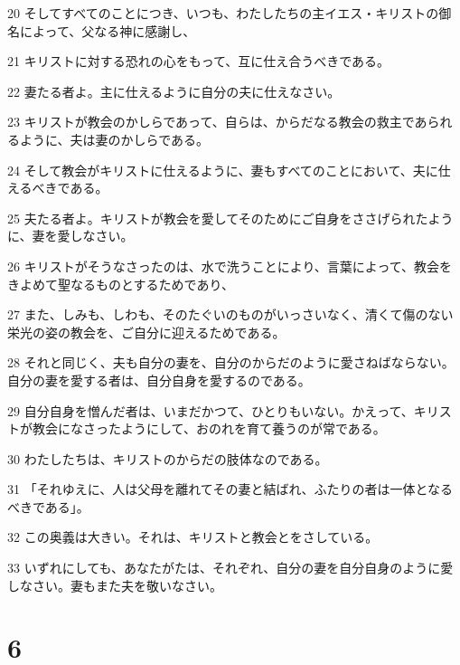\par 20 そしてすべてのことにつき、いつも、わたしたちの主イエス・キリストの御名によって、父なる神に感謝し、
\par 21 キリストに対する恐れの心をもって、互に仕え合うべきである。
\par 22 妻たる者よ。主に仕えるように自分の夫に仕えなさい。
\par 23 キリストが教会のかしらであって、自らは、からだなる教会の救主であられるように、夫は妻のかしらである。
\par 24 そして教会がキリストに仕えるように、妻もすべてのことにおいて、夫に仕えるべきである。
\par 25 夫たる者よ。キリストが教会を愛してそのためにご自身をささげられたように、妻を愛しなさい。
\par 26 キリストがそうなさったのは、水で洗うことにより、言葉によって、教会をきよめて聖なるものとするためであり、
\par 27 また、しみも、しわも、そのたぐいのものがいっさいなく、清くて傷のない栄光の姿の教会を、ご自分に迎えるためである。
\par 28 それと同じく、夫も自分の妻を、自分のからだのように愛さねばならない。自分の妻を愛する者は、自分自身を愛するのである。
\par 29 自分自身を憎んだ者は、いまだかつて、ひとりもいない。かえって、キリストが教会になさったようにして、おのれを育て養うのが常である。
\par 30 わたしたちは、キリストのからだの肢体なのである。
\par 31 「それゆえに、人は父母を離れてその妻と結ばれ、ふたりの者は一体となるべきである」。
\par 32 この奥義は大きい。それは、キリストと教会とをさしている。
\par 33 いずれにしても、あなたがたは、それぞれ、自分の妻を自分自身のように愛しなさい。妻もまた夫を敬いなさい。

\chapter{6}

